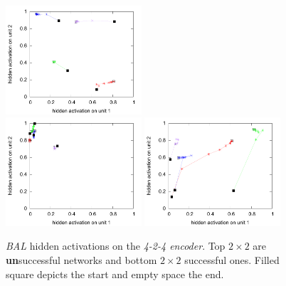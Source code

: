 \begin{figure}[h]
  \includegraphics[width=0.45\textwidth]{img/hid-bal-good-convex.pdf}  \\
  \includegraphics[width=0.45\textwidth]{img/hid-bal-good-step.pdf}  
  \includegraphics[width=0.45\textwidth]{img/hid-bal-good-stagnation.pdf}  \\ 
  \caption{\emph{BAL} hidden activations on the \emph{4-2-4 encoder}. Top $2\times2$ are {\bf un}successful networks and bottom $2\times2$ successful ones. Filled square depicts the start and empty space the end.}
  \label{fig:results-hidden-activations-bal}
\end{figure}

